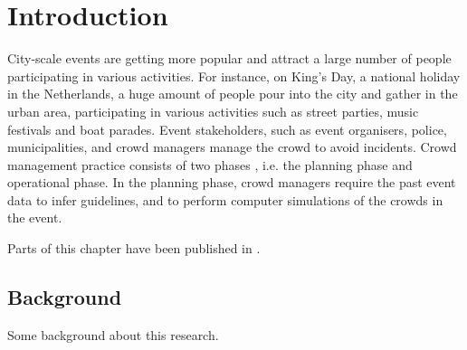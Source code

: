 \chapter{Introduction}\label{ch1_title}

\graphicspath{{./ch-1-intro/images/}}

City-scale events are getting more popular and attract a large number of people participating in various activities. For instance, on King’s Day, a national holiday in the Netherlands, a huge amount of people pour into the city and gather in the urban area, participating in various activities such as street parties, music festivals and boat parades. Event stakeholders, such as event organisers, police, municipalities, and crowd managers manage the crowd to avoid incidents. Crowd management practice consists of two phases \citep{martella2017current}, i.e. the planning phase and operational phase. In the planning phase, crowd managers require the past event data to infer guidelines, and to perform computer simulations of the crowds in the event.


Parts of this chapter have been published in \cite{NegDeS:05-021}.

\section{Background}\label{ch1_background}
Some background about this research.
